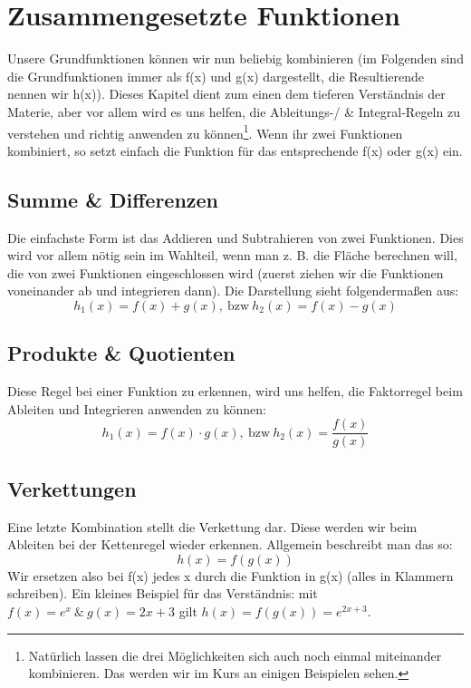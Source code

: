 \section{Zusammengesetzte Funktionen}
	Unsere Grundfunktionen können wir nun beliebig kombinieren (im Folgenden sind
	die Grundfunktionen immer als f(x) und g(x) dargestellt, die Resultierende
	nennen wir h(x)). Dieses Kapitel dient zum einen dem tieferen Verständnis der
	Materie, aber vor allem wird es uns helfen, die Ableitungs-/ \& Integral-Regeln
	zu verstehen und richtig anwenden zu können\footnote{Natürlich lassen die drei
	Möglichkeiten sich auch noch einmal miteinander kombinieren. Das werden wir im
	Kurs an einigen Beispielen sehen.}. Wenn ihr zwei Funktionen kombiniert, so
	setzt einfach die Funktion für das entsprechende f(x) oder g(x) ein.

	\subsection{Summe \& Differenzen}
		Die einfachste Form ist das Addieren und Subtrahieren von zwei Funktionen.
		Dies wird vor allem nötig sein im Wahlteil, wenn man z. B. die Fläche
		berechnen will, die von zwei Funktionen eingeschlossen wird (zuerst ziehen wir
		die Funktionen voneinander ab und integrieren dann). Die Darstellung sieht
		folgendermaßen aus:
		\[h_1(x)=f(x)+g(x), \mathrm{\ bzw\ } h_2(x)=f(x)-g(x)\]
	
	\subsection{Produkte \& Quotienten}
		Diese Regel bei einer Funktion zu erkennen, wird uns helfen, die Faktorregel
		beim Ableiten und Integrieren anwenden zu können:
		\[h_1(x)=f(x)\cdot g(x), \mathrm{\ bzw\ } h_2(x)=\frac{f(x)}{g(x)}\]

	\subsection{Verkettungen}
		Eine letzte Kombination stellt die Verkettung dar. Diese werden wir beim
		Ableiten bei der Kettenregel wieder erkennen. Allgemein beschreibt man das so:
		\[h(x)=f(g(x))\]
		Wir ersetzen also bei f(x) jedes x durch die Funktion in g(x) (alles in
		Klammern schreiben). Ein kleines Beispiel für das Verständnis: mit \(f(x)=e^x\
		\&\ g(x)=2x+3\) gilt \(h(x)=f(g(x))=e^{2x+3}\).
